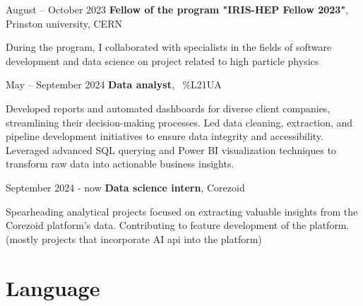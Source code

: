 \documentclass[10pt, letterpaper]{article}
\begin{document}
     
        \begin{twocolentry}{
            August – October 2023
        }
            \textbf{Fellow of the program "IRIS-HEP Fellow 2023"}, Prinston university, CERN \end{twocolentry}

        \vspace{0.10 cm}
        \begin{onecolentry}
            During the program, I collaborated with specialists in the fields of software development and data science on project related to high particle physics
        \end{onecolentry}



        \begin{twocolentry}{
            May – September 2024
        }
            \textbf{Data analyst}, ~\%L21UA \end{twocolentry}
        
        \vspace{0.10 cm}
        \begin{onecolentry}
            Developed reports and automated dashboards for diverse client companies, streamlining their decision-making processes. Led data cleaning, extraction, and pipeline development initiatives to ensure data integrity and accessibility. Leveraged advanced SQL querying and Power BI visualization techniques to transform raw data into actionable business insights.
        \end{onecolentry}
        
        \begin{twocolentry}{
            September 2024 - now
        }
            \textbf{Data science intern}, Corezoid \end{twocolentry}
        
        \vspace{0.10 cm}
        \begin{onecolentry}
            Spearheading analytical projects focused on extracting valuable insights from the Corezoid platform's data. Contributing to feature development of the platform.(mostly projects that incorporate AI api into the platform)
        \end{onecolentry}

    \section{Language}
        
\end{document}
